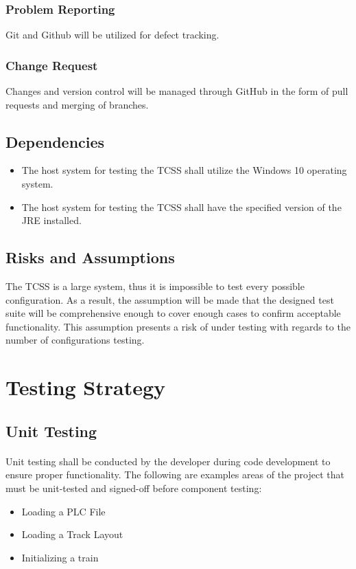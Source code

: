 \documentclass{article}
\begin{document}
    
    \subsubsection{Problem Reporting}
    \parargraph{}
    Git and Github will be utilized for defect tracking.
    
    \subsubsection{Change Request}
    Changes and version control will be managed through GitHub in the form of pull requests and merging of branches.
    
    \subsection{Dependencies}
    \begin{itemize}
        \item The host system for testing the TCSS shall utilize the Windows 10 operating system.
        \item The host system for testing the TCSS shall have the specified version of the JRE installed.
    \end{itemize}
    
    \subsection{Risks and Assumptions}
    \parargraph{}
    The TCSS is a large system, thus it is impossible to test every possible configuration. As a result, the assumption will be made that the designed test suite will be comprehensive enough to cover enough cases to confirm acceptable functionality. This assumption presents a risk of under testing with regards to the number of configurations testing.
    
\section{Testing Strategy}

    \subsection{Unit Testing}
    \paragraph{}
    Unit testing shall be conducted by the developer during code development to ensure proper functionality. The following are examples areas of the project that must be unit-tested and signed-off before component testing:
        \begin{itemize}
            \item Loading a PLC File
            \item Loading a Track Layout
            \item Initializing a train
        \end{itemize}
    
\end{document}
